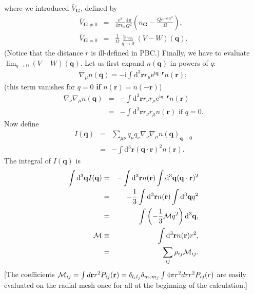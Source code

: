 \documentclass[a4paper,twocolumn,12pt]{article}
\begin{document}
where we introduced $\bar{V}_\mathbf{G}$, defined by
\begin{eqnarray}
\bar{V}_{\mathbf{G}\neq0}&=&\frac{e^2}{4\pi\epsilon_0}\frac{4\pi}{G^2} \left(n_\mathbf{G}-\frac{Q\mathrm{e}^{-\alpha G^2}}{\Omega}\right),\\
\label{eq:VbG=0}\bar{V}_{\mathbf{G}=0}&=&\frac{1}{\Omega}\lim_{q\rightarrow0}(V-W)(\mathbf{q}).
\end{eqnarray}
(Notice that the distance $r$ is ill-defined in PBC.)  Finally, we
have to evaluate $\lim_{q\rightarrow0}(V-W)(\mathbf{q})$.  Let us
first expand $n(\mathbf{q})$ in powers of $q$:
\begin{eqnarray}
\nabla_\mu n(\mathbf{q}) = -\mathrm{i} \int \mathrm{d}^3\mathbf{r} r_\mu \mathrm{e}^{\mathrm{i}\mathbf{q}\cdot\mathbf{r}} n(\mathbf{r});
\end{eqnarray}
(this term vanishes for $q=0$ {\bf if} $n(\mathbf{r})=n(-\mathbf{r})$)
\begin{eqnarray}
\nabla_\nu \nabla_\mu n(\mathbf{q}) &=& - \int \mathrm{d}^3\mathbf{r} r_\nu r_\mu \mathrm{e}^{\mathrm{i}\mathbf{q}\cdot\mathbf{r}} n(\mathbf{r})\\
&=&- \int \mathrm{d}^3\mathbf{r} r_\nu r_\mu n(\mathbf{r})\text{~if $q=0$}.
\end{eqnarray}
Now define
\begin{eqnarray}
I(\mathbf{q})&=&\sum_{\mu\nu} q_\mu q_\nu \nabla_\nu \nabla_\mu
n(\mathbf{q})_{\mathbf{q}=0} \\&=& -\int \mathrm{d}^3\mathbf{r}
(\mathbf{q}\cdot\mathbf{r})^2 n(\mathbf{r}).
\end{eqnarray}
The integral of $I(\mathbf{q})$ is
\begin{eqnarray}
\int \mathrm{d}^3\mathbf{q}
I(\mathbf{q})&=&-\int\mathrm{d}^3\mathbf{r}n(\mathbf{r})
\int\mathrm{d}^3\mathbf{q} (\mathbf{q}\cdot\mathbf{r})^2 \nonumber\\&=&
-\frac{1}{3}\int\mathrm{d}^3\mathbf{r}n(\mathbf{r})
\int\mathrm{d}^3\mathbf{q}q^2\nonumber\\
&=&
\int\left(-\frac{1}{3}{\cal{M}}q^2\right)\mathrm{d}^3\mathbf{q},\\
{\cal{M}}&\equiv&\int\mathrm{d}^3\mathbf{r}n(\mathbf{r})r^2,\\
&=&\sum_{ij}\rho_{ij}{\cal{M}}_{ij}.
\end{eqnarray}
[The coefficients
${\cal{M}}_{ij}=\int{d{\mathbf{r}}r^2P_{ij}({\mathbf{r}})}
=\delta_{l_il_j}\delta_{m_im_j}\int{4{\pi}r^2drr^2P_{ij}(r)}$ are
easily evaluated on the radial mesh once for all at the beginning of
the calculation.]
\end{document}
